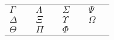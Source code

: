 \documentclass{article}
\newcommand*\s[1]{$#1$&\texttt{\string#1}}
\begin{document}
\begin{tabular}{l@{~}ll@{~}ll@{~}ll@{~}l}
\s\Gamma &\s\Lambda &\s\Sigma   &\s\Psi   \\
\s\Delta &\s\Xi     &\s\Upsilon &\s\Omega \\
\s\Theta &\s\Pi     &\s\Phi
\end{tabular}
\end{document}
